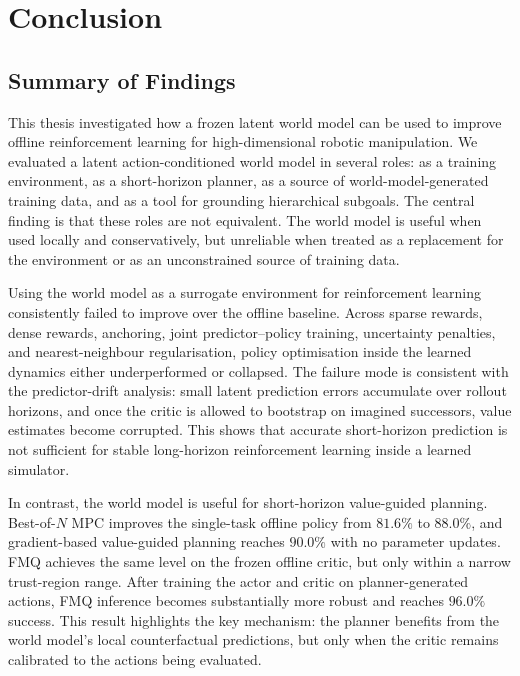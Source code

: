 
\chapter{Conclusion}
\label{chap:conclusion}

\section{Summary of Findings}
\label{sec:concl-summary}

This thesis investigated how a frozen latent world model can be used to
improve offline reinforcement learning for high-dimensional robotic
manipulation. We evaluated a latent action-conditioned world model in several roles: as
a training environment, as a short-horizon planner, as a source of
world-model-generated training data, and as a tool for grounding
hierarchical subgoals. The central finding is that these roles are not
equivalent. The world model is useful when used locally and
conservatively, but unreliable when treated as a replacement for the
environment or as an unconstrained source of training data.

Using the world model as a surrogate environment for reinforcement
learning consistently failed to improve over the offline baseline.
Across sparse rewards, dense rewards, anchoring, joint
predictor--policy training, uncertainty penalties, and
nearest-neighbour regularisation, policy optimisation inside the
learned dynamics either underperformed or collapsed. The failure mode is
consistent with the predictor-drift analysis: small latent prediction
errors accumulate over rollout horizons, and once the critic is allowed
to bootstrap on imagined successors, value estimates become corrupted.
This shows that accurate short-horizon prediction is not sufficient for
stable long-horizon reinforcement learning inside a learned simulator.

In contrast, the world model is useful for short-horizon
value-guided planning. Best-of-$N$ MPC improves the single-task offline
policy from $81.6\%$ to $88.0\%$, and gradient-based value-guided
planning reaches $90.0\%$ with no parameter updates. FMQ achieves the
same level on the frozen offline critic, but only within a narrow
trust-region range. After training the actor and critic on
planner-generated actions, FMQ inference becomes substantially more
robust and reaches $96.0\%$ success. This result highlights the key
mechanism: the planner benefits from the world model's local
counterfactual predictions, but only when the critic remains calibrated
to the actions being evaluated.

